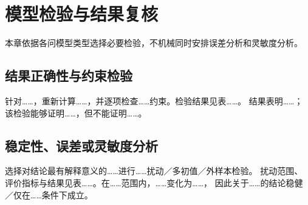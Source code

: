 \section{模型检验与结果复核}

本章依据各问模型类型选择必要检验，不机械同时安排误差分析和灵敏度分析。


\subsection{结果正确性与约束检验}

针对……，重新计算……，并逐项检查……约束。检验结果见表……。
结果表明……；该检验能够证明……，但不能证明……。

\subsection{稳定性、误差或灵敏度分析}

选择对结论最有解释意义的……进行……扰动／多初值／外样本检验。
扰动范围、评价指标与结果见表……。在……范围内，……变化为……，
因此关于……的结论稳健／仅在……条件下成立。

